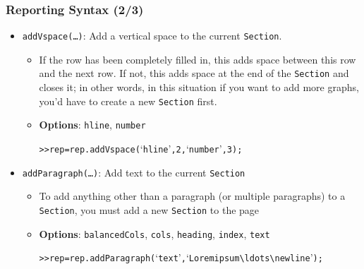 \documentclass[10pt]{beamer}
\newcommand{\myitem}{\item[$\bullet$]}
\begin{document}
\begin{frame}[fragile,t]
  \frametitle{Reporting Syntax (2/3)}
  \begin{itemize}
    \myitem \texttt{addVspace(\ldots)}: Add a vertical space to the current \texttt{Section}.
    \begin{itemize}
      \myitem If the row has been completely filled in, this adds space between this row and the next row. If not, this adds space at the end of the \texttt{Section} and closes it; in other words, in this situation if you want to add more graphs, you'd have to create a new \texttt{Section} first.
      \myitem \textbf{Options}: \texttt{hline}, \texttt{number}
      \begin{alltt}
>> rep = rep.addVspace(`hline', 2, `number', 3);
    \end{alltt}
    \end{itemize}
    \myitem \texttt{addParagraph(\ldots)}: Add text to the current \texttt{Section}
    \begin{itemize}
      \myitem To add anything other than a paragraph (or multiple paragraphs) to a \texttt{Section}, you must add a new \texttt{Section} to the page
      \myitem \textbf{Options}: \texttt{balancedCols}, \texttt{cols}, \texttt{heading}, \texttt{index}, \texttt{text}
      \begin{alltt}
>> rep = rep.addParagraph(`text', `Lorem ipsum\textbackslash{}ldots\textbackslash{}newline');
      \end{alltt}
    \end{itemize}
  \end{itemize}
\end{frame}
\end{document}
